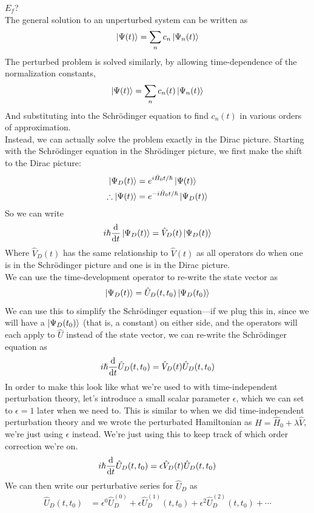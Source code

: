 \documentclass[a4paper]{article}
\begin{document}
$E_f$?\\
The general solution to an unperturbed system can be written as
\[ \left\lvert \Psi(t)\right\rangle = \sum_n c_n\left\lvert \Psi_n(t)\right\rangle \]
The perturbed problem is solved similarly, by allowing time-dependence of
the normalization constants,
\[ \left\lvert \Psi(t)\right\rangle = \sum_n c_n(t)\left\lvert \Psi_n(t)\right\rangle \]
And substituting into the Schr\"odinger equation to find $c_n(t)$ in various
orders of approximation.\\
Instead, we can actually solve the problem exactly in the Dirac picture.
Starting with the Schr\"odinger equation in the Shr\"odinger picture, we first
make the shift to the Dirac picture:
\begin{align*}
	\left\lvert \Psi_D(t)\right\rangle &= e^{i\hat{H}_0t/\hslash}\left\lvert \Psi(t)\right\rangle\\
	\therefore
	\left\lvert \Psi(t)\right\rangle &= e^{-i\hat{H}_0t/\hslash}\left\lvert \Psi_D(t)\right\rangle\\
\end{align*}
So we can write
\[ i\hslash\frac{\mathrm{d} }{\mathrm{d} t}\left\lvert \Psi_D(t)\right\rangle = \hat{V}_D(t)\left\lvert \Psi_D(t)\right\rangle \]
Where $\hat{V}_D(t)$ has the same relationship to $\hat{V}(t)$ as all operators
do when one is in the Schr\"odinger picture and one is in the Dirac picture.\\
We can use the time-development operator to re-write the state vector as
\[ \left\lvert \Psi_D(t)\right\rangle = \hat{U}_D(t,t_0)\left\lvert \Psi_D(t_0)\right\rangle \]
We can use this to simplify the Schr\"odinger equation---if we plug this in,
since we will have a $\left\lvert \Psi_D(t_0)\right\rangle$ (that is, a constant) on either side,
and the operators will each apply to $\hat{U}$ instead of the state vector,
we can re-write the Schr\"odinger equation as
\[ i\hslash\frac{\mathrm{d} }{\mathrm{d} t}\hat{U}_D(t,t_0) = \hat{V}_D(t)\hat{U}_D(t,t_0) \]
In order to make this look like what we're used to with time-independent
perturbation theory, let's introduce a small scalar parameter $\epsilon$,
which we can set to $\epsilon=1$ later when we need to. This is similar to
when we did time-independent perturbation theory and we wrote the perturbated
Hamiltonian as $\hat{H} = \hat{H}_0+\lambda\hat{V}$, we're just using
$\epsilon$ instead. We're just using this to keep track of which order
correction we're on.
\[ i\hslash\frac{\mathrm{d} }{\mathrm{d} t}\hat{U}_D(t,t_0) = \epsilon\hat{V}_D(t)\hat{U}_D(t,t_0) \]
We can then write our perturbative series for $\hat{U}_D$ as
\begin{align*}
	\hat{U}_D(t,t_0) &= \epsilon^0\hat{U}_D^{(0)} +
	\epsilon\hat{U}_D^{(1)}(t,t_0) +
	\epsilon^2\hat{U}_D^{(2)}(t,t_0) +
	\cdots\\
\end{align*}
\end{document}
